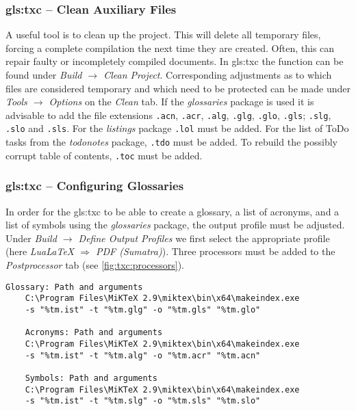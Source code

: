 \subsubsection{\gls*{gls:txc} -- Clean Auxiliary Files}
\label{sec:txc:auxFiles}
A useful tool is to clean up the project. This will delete all temporary files, forcing a complete compilation the next time they are created. Often, this can repair faulty or incompletely compiled documents. In \gls{gls:txc} the function can be found under \textit{Build $\rightarrow$ Clean Project}. Corresponding adjustments as to which files are considered temporary and which need to be protected can be made under \textit{Tools $\rightarrow$ Options} on the \textit{Clean} tab. If the \textit{glossaries} package is used it is advisable to add the file extensions \texttt{.acn}, \texttt{.acr}, \texttt{.alg}, \texttt{.glg}, \texttt{.glo}, \texttt{.gls}; \texttt{.slg}, \texttt{.slo} and \texttt{.sls}. For the \textit{listings} package \texttt{.lol} must be added. For the list of ToDo tasks from the \textit{todonotes} package, \texttt{.tdo} must be added. To rebuild the possibly corrupt table of contents, \texttt{.toc} must be added.




\subsubsection{\gls*{gls:txc} -- Configuring Glossaries}
\label{sec:txc:glossary}
In order for the \gls{gls:txc} to be able to create a glossary, a list of acronyms, and a list of symbols using the \textit{glossaries} package, the output profile must be adjusted. Under \textit{Build $\rightarrow$ Define Output Profiles} we first select the appropriate profile (here \textit{LuaLaTeX $\Rightarrow$ PDF (Sumatra)}). Three processors must be added to the \textit{Postprocessor} tab (see \autoref{fig:txc:processors}).

\begin{lstlisting}[language=none, caption={[Settings for \gls{gls:txc} -- Processors for the package \textit{glossaries}]Passing parameters to \textit{MakeIndex} for using the \textit{glossaries} package in \gls{gls:txc}.}]
	Glossary: Path and arguments
	C:\Program Files\MiKTeX 2.9\miktex\bin\x64\makeindex.exe
	-s "%tm.ist" -t "%tm.glg" -o "%tm.gls" "%tm.glo"
	
	Acronyms: Path and arguments
	C:\Program Files\MiKTeX 2.9\miktex\bin\x64\makeindex.exe
	-s "%tm.ist" -t "%tm.alg" -o "%tm.acr" "%tm.acn"
	
	Symbols: Path and arguments
	C:\Program Files\MiKTeX 2.9\miktex\bin\x64\makeindex.exe
	-s "%tm.ist" -t "%tm.slg" -o "%tm.sls" "%tm.slo"
\end{lstlisting}

